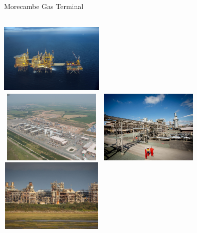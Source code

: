 \documentclass{beamer}
\begin{document}
\begin{frame}{Morecambe Gas Terminal}

\begin{columns}[t]
\centering
\includegraphics[width=5cm,height=3.5cm]{morecambe-01.jpg}\\
\includegraphics[width=5cm,height=3.5cm]{morecambe-02.jpg}
\centering
\includegraphics[width=5cm,height=3.5cm]{morecambe-03.jpg}\\
\includegraphics[width=5cm,height=3.5cm]{morecambe-04.jpg}
\end{columns}

\end{frame}
\end{document}

